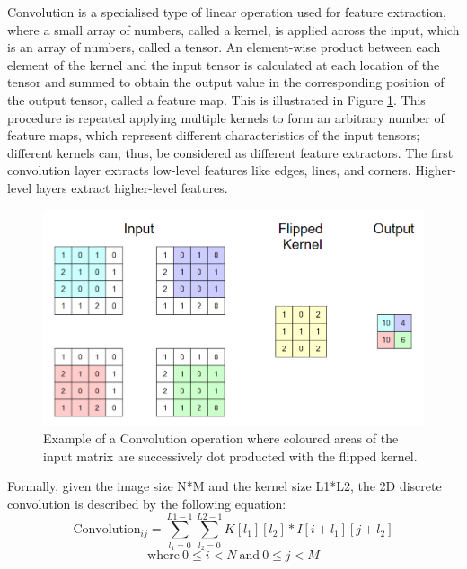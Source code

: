 Convolution is a specialised type of linear operation used for feature extraction, where a small array of numbers, called a kernel, is applied across the input, which is an array of numbers, called a tensor. An element-wise product between each element of the kernel and the input tensor is calculated at each location of the tensor and summed to obtain the output value in the corresponding position of the output tensor, called a feature map. This is illustrated in Figure \ref{Convolution}. This procedure is repeated applying multiple kernels to form an arbitrary number of feature maps, which represent different characteristics of the input tensors; different kernels can, thus, be considered as different feature extractors. The first convolution layer extracts low-level features like edges, lines, and corners. Higher-level layers extract higher-level features. \\

\begin{figure}[H]
  \centering
  \includegraphics[scale = 0.475]{Images/convolution.png}
  \caption{Example of a Convolution operation where coloured areas of the input matrix are successively dot producted with the flipped kernel.}
  \label{Convolution}
\end{figure}

Formally, given the image size N*M and the kernel size L1*L2, the 2D discrete convolution is described by the following equation: \\

\begin{equation}
  \text{Convolution}_{ij} = \sum_{l_1=0}^{L1-1} \sum_{l_2=0}^{L2-1} K[l_1][l_2]*I[i+l_1][j+l_2]
\end{equation}
$$\text{where} \ 0 \leq i < N \ \text{and} \ 0 \leq j < M$$ \\

